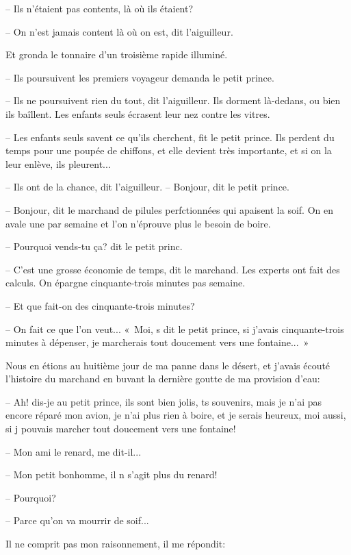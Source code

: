 \documentclass[a4paper]{report}
\begin{document}
-- Ils n'étaient pas contents, là où ils étaient?

-- On n'est jamais content là où on est, dit l'aiguilleur.

Et gronda le tonnaire d'un troisième rapide illuminé.

-- Ils poursuivent les premiers voyageur demanda le petit prince.

-- Ils ne poursuivent rien du tout, dit l'aiguilleur. Ils dorment là-dedans, ou bien ils ba\^illent. Les enfants seuls écrasent leur nez contre les vitres.

-- Les enfants seuls savent ce qu'ils cherchent, fit le petit prince. Ils perdent du temps pour une poupée de chiffons, et elle devient très importante, et si on la leur enlève, ils pleurent...

-- Ils ont de la chance, dit l'aiguilleur.
\parachapter{} %
-- Bonjour, dit le petit prince.

-- Bonjour, dit le marchand de pilules perfctionnées qui apaisent la soif. On en avale une par semaine et l'on n'éprouve plus le besoin de boire.

-- Pourquoi vends-tu ça? dit le petit princ.

-- C'est une grosse économie de temps, dit le marchand. Les experts ont fait des calculs. On épargne cinquante-trois minutes pas semaine.

-- Et que fait-on des cinquante-trois minutes?

-- On fait ce que l'on veut...
«~Moi, s dit le petit prince, si j'avais cinquante-trois minutes à dépenser, je marcherais tout doucement vers une fontaine...~»


\parachapter{} %
Nous en étions au huitième jour de ma panne dans le désert, et j'avais écouté l'histoire du marchand en buvant la dernière goutte de ma provision d'eau:

-- Ah! dis-je au petit prince, ils sont bien jolis, ts souvenirs, mais je n'ai pas encore réparé mon avion, je n'ai plus rien à boire, et je serais heureux, moi aussi, si j pouvais marcher tout doucement vers une fontaine!

-- Mon ami le renard, me dit-il...

-- Mon petit bonhomme, il n s'agit plus du renard!

-- Pourquoi?

-- Parce qu'on va mourrir de soif...

Il ne comprit pas mon raisonnement, il me répondit:
\end{document}
